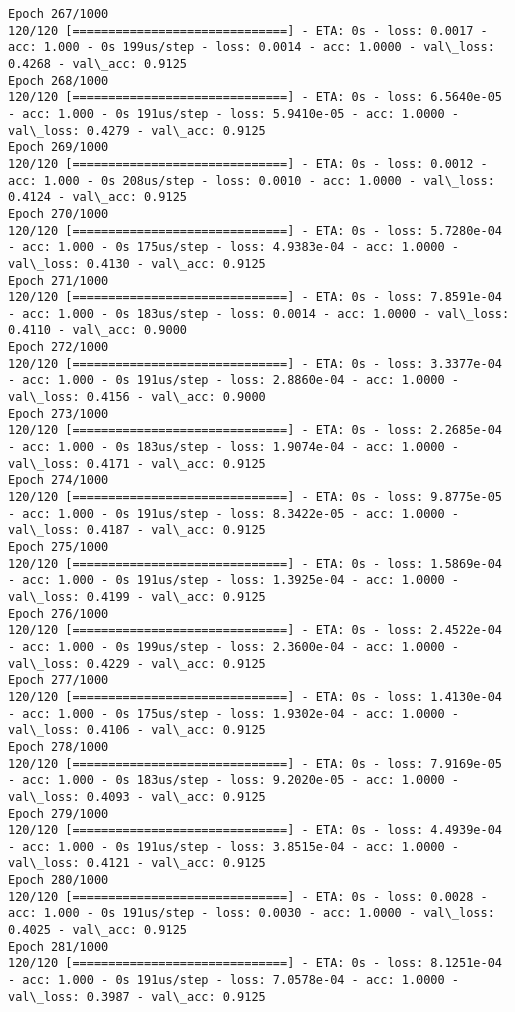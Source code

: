 \documentclass[11pt]{article}
\begin{document}
\begin{Verbatim}[commandchars=\\\{\}]
Epoch 267/1000
120/120 [==============================] - ETA: 0s - loss: 0.0017 - acc: 1.000 - 0s 199us/step - loss: 0.0014 - acc: 1.0000 - val\_loss: 0.4268 - val\_acc: 0.9125
Epoch 268/1000
120/120 [==============================] - ETA: 0s - loss: 6.5640e-05 - acc: 1.000 - 0s 191us/step - loss: 5.9410e-05 - acc: 1.0000 - val\_loss: 0.4279 - val\_acc: 0.9125
Epoch 269/1000
120/120 [==============================] - ETA: 0s - loss: 0.0012 - acc: 1.000 - 0s 208us/step - loss: 0.0010 - acc: 1.0000 - val\_loss: 0.4124 - val\_acc: 0.9125
Epoch 270/1000
120/120 [==============================] - ETA: 0s - loss: 5.7280e-04 - acc: 1.000 - 0s 175us/step - loss: 4.9383e-04 - acc: 1.0000 - val\_loss: 0.4130 - val\_acc: 0.9125
Epoch 271/1000
120/120 [==============================] - ETA: 0s - loss: 7.8591e-04 - acc: 1.000 - 0s 183us/step - loss: 0.0014 - acc: 1.0000 - val\_loss: 0.4110 - val\_acc: 0.9000
Epoch 272/1000
120/120 [==============================] - ETA: 0s - loss: 3.3377e-04 - acc: 1.000 - 0s 191us/step - loss: 2.8860e-04 - acc: 1.0000 - val\_loss: 0.4156 - val\_acc: 0.9000
Epoch 273/1000
120/120 [==============================] - ETA: 0s - loss: 2.2685e-04 - acc: 1.000 - 0s 183us/step - loss: 1.9074e-04 - acc: 1.0000 - val\_loss: 0.4171 - val\_acc: 0.9125
Epoch 274/1000
120/120 [==============================] - ETA: 0s - loss: 9.8775e-05 - acc: 1.000 - 0s 191us/step - loss: 8.3422e-05 - acc: 1.0000 - val\_loss: 0.4187 - val\_acc: 0.9125
Epoch 275/1000
120/120 [==============================] - ETA: 0s - loss: 1.5869e-04 - acc: 1.000 - 0s 191us/step - loss: 1.3925e-04 - acc: 1.0000 - val\_loss: 0.4199 - val\_acc: 0.9125
Epoch 276/1000
120/120 [==============================] - ETA: 0s - loss: 2.4522e-04 - acc: 1.000 - 0s 199us/step - loss: 2.3600e-04 - acc: 1.0000 - val\_loss: 0.4229 - val\_acc: 0.9125
Epoch 277/1000
120/120 [==============================] - ETA: 0s - loss: 1.4130e-04 - acc: 1.000 - 0s 175us/step - loss: 1.9302e-04 - acc: 1.0000 - val\_loss: 0.4106 - val\_acc: 0.9125
Epoch 278/1000
120/120 [==============================] - ETA: 0s - loss: 7.9169e-05 - acc: 1.000 - 0s 183us/step - loss: 9.2020e-05 - acc: 1.0000 - val\_loss: 0.4093 - val\_acc: 0.9125
Epoch 279/1000
120/120 [==============================] - ETA: 0s - loss: 4.4939e-04 - acc: 1.000 - 0s 191us/step - loss: 3.8515e-04 - acc: 1.0000 - val\_loss: 0.4121 - val\_acc: 0.9125
Epoch 280/1000
120/120 [==============================] - ETA: 0s - loss: 0.0028 - acc: 1.000 - 0s 191us/step - loss: 0.0030 - acc: 1.0000 - val\_loss: 0.4025 - val\_acc: 0.9125
Epoch 281/1000
120/120 [==============================] - ETA: 0s - loss: 8.1251e-04 - acc: 1.000 - 0s 191us/step - loss: 7.0578e-04 - acc: 1.0000 - val\_loss: 0.3987 - val\_acc: 0.9125

\end{Verbatim}
\end{document}
